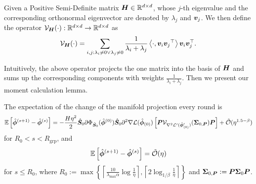 \begin{definition}
    Given a Positive Semi-Definite matrix ${\bm{H}} \in \mathbb{R}^{d\times d}$, whose $j$-th eigenvalue and the corresponding orthonormal eigenvector are denoted by $\lambda_j$ and ${\bm{v}}_j$. We then define the operator $\mathcal{V}_{\bm{H}}(\cdot):\mathbb{R}^{d \times d} \to \mathbb{R}^{d \times d}$ as
    \begin{align*}
        \mathcal{V}_{{\bm{H}}}(\cdot) = \sum_{i,j:\lambda_i\neq0\vee\lambda_j\neq0} 
        \frac{1}{\lambda_i+\lambda_j}\left\langle \cdot,{\bm{v}}_i{\bm{v}}_j{^\top}\right\rangle {\bm{v}}_i{\bm{v}}_j^\top.
    \end{align*}
\end{definition}
Intuitively, the above operator projects the one matrix into the basis of ${\bm{H}}$ and sums up the corresponding components with weights $\frac{1}{\lambda_i+\lambda_j}$. Then we present our moment calculation lemma.
\begin{lemma}\label{lma:1st-moment}
The expectation of the change of the manifold projection every round is
\begin{align*}
    \mathbb{E}\left[ \hat{{\bm{\phi}}}^{(s+1)} - \hat{{\bm{\phi}}}^{(s)} \right] = -\frac{H \eta^2}{2} \hat{{\bm{S}}}_0 \partial \Phi_{\hat{{\bm{S}}}_0}(\hat{{\bm{\phi}}}^{(0)}) \hat{{\bm{S}}}_0 \partial^2 \nabla \mathcal{L}(\hat{{\bm{\phi}}}_{(0)}) \left[{\bm{P}} \mathcal{V}_{\nabla^2 \mathcal{L}'(\hat{{\bm{\phi}}}'_{(0)})}( {\bm{\Sigma}}_{0,{\bm{P}}}){\bm{P}}\right] + \tilde{\mathcal{O}}(\eta^{1.5-\beta})
\end{align*}
for $R_0 < s < R_{\mathrm{grp}}$, and 
\begin{align*}
    \mathbb{E}\left[ \hat{{\bm{\phi}}}^{(s+1)} - \hat{{\bm{\phi}}}^{(s)} \right] = \tilde{\mathcal{O}}(\eta) 
\end{align*}
for $s \leq R_0$, where \( R_0 := \max\left\{\left\lceil \frac{10}{\lambda_{\max} \alpha} \log \frac{1}{\eta} \right\rceil, \left\lceil 2\log_{1/\beta} \frac{1}{\eta} \right\rceil \right\} \) and ${\bm{\Sigma}}_{0,{\bm{P}}}:= {\bm{P}} {\bm{\Sigma}}_0 {\bm{P}}$.
\end{lemma}
